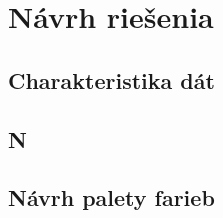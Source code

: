 \chapter{Návrh riešenia}


\section{Charakteristika dát}

\section{N}

\section{Návrh palety farieb}
